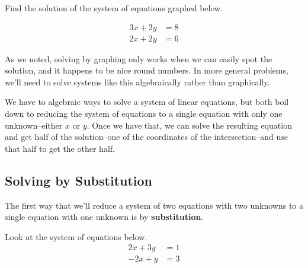 \begin{try}
Find the solution of the system of equations graphed below.
\begin{minipage}[b]{0.48\textwidth}
\begin{align*}
3x+2y &= 8\\
2x+2y &= 6
\end{align*}
\end{minipage}
\begin{minipage}{0.48\textwidth}
\end{minipage}
\end{try}

As we noted, solving by graphing only works when we can easily spot the solution, and it happens to be nice round numbers.  In more general problems, we'll need to solve systems like this algebraically rather than graphically.

We have to algebraic ways to solve a system of linear equations, but both boil down to reducing the system of equations to a single equation with only one unknown--either $x$ or $y$.  Once we have that, we can solve the resulting equation and get half of the solution--one of the coordinates of the intersection--and use that half to get the other half.

\subsection{Solving by Substitution}
The first way that we'll reduce a system of two equations with two unknowns to a single equation with one unknown is by \textbf{substitution}.

Look at the system of equations below.
\begin{align*}
2x+3y &= 1\\
-2x+y &= 3
\end{align*}

